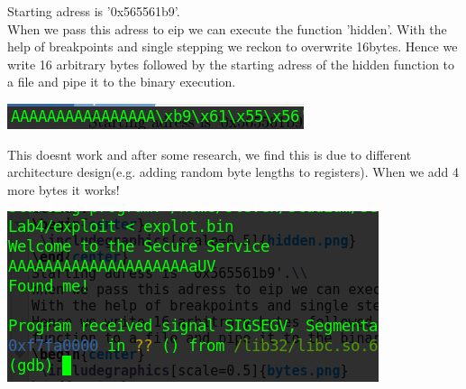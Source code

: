\documentclass[a4paper,10pt]{article}
\begin{document}
Starting adress is '0x565561b9'.\\
When we pass this adress to eip we can execute the function 'hidden'.
With the help of breakpoints and single stepping we reckon to overwrite 16bytes.
Hence we write 16 arbitrary bytes followed by the starting adress of the hidden function to a file and pipe it to the binary execution. 
\begin{center}
 \includegraphics[scale=0.5]{bytes.png}
\end{center}
This doesnt work and after some research, we find this is due to different architecture design(e.g. adding random byte lengths to registers). When we add 4 more bytes it works!
\begin{center}
 \includegraphics[scale=0.5]{found.png}
\end{center}
\end{document}
